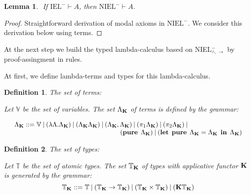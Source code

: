 \documentclass[a4paper]{article}
\newtheorem{lemma}{Lemma}
\newtheorem{defin}{Definition}
\begin{document}
\begin{lemma}
  $ $
  If $\text{IEL}^{-} \vdash A$, then $\text{NIEL}^{-} \vdash A$.
\end{lemma}

\begin{proof}
  Straightforward derivation of modal axioms in $\text{NIEL}^{-}$. We consider this derivation below using terms.
\end{proof}

  \vspace{\baselineskip}

  At the next step we build the typed lambda-calculus based on NIEL$^{-}_{\land, \to}$ by proof-assingment in
  rules.

  At first, we define lambda-terms and types for this lambda-calculus.

  \vspace{\baselineskip}

  \begin{defin} The set of terms:

  Let $\mathbb{V}$ be the set of variables. The set $\Lambda_{{\bf K}}$ of terms is defined by the grammar:

$\begin{array}{lll}
& \Lambda_{{\bf K}} ::= \mathbb{V} \: | \:  (\lambda \Lambda.\Lambda_{{\bf K}}) \: | \: (\Lambda_{{\bf K}}\Lambda_{{\bf K}}) \: | \: (\Lambda_{{\bf K}} , \Lambda_{{\bf K}}) \: | \: (\pi_1 \Lambda_{{\bf K}}) \: | \: (\pi_2 \Lambda_{{\bf K}}) \: | & \\
& \quad\quad\quad\quad\quad\quad\quad\quad\quad\quad\quad\quad\quad\quad\quad\quad ({\bf pure \: } \: \Lambda_{{\bf K}}) \: | \: ({\bf let \:\: pure} \:\: \Lambda_{{\bf K}} = \Lambda_{{\bf K}} \:\: {\bf in} \:\: \Lambda_{{\bf K}})
\end{array}$

  \end{defin}

  \begin{defin} The set of types:

  Let $\mathbb{T}$ be the set of atomic types. The set $\mathbb{T}_{{\bf K}}$ of types with applicative
  functor ${\bf K}$ is generated by the grammar:
  \begin{equation}
    \mathbb{T}_{{\bf K}} ::= \mathbb{T} \: | \: (\mathbb{T}_{{\bf K}} \to \mathbb{T}_{{\bf K}}) \: |
    \: (\mathbb{T}_{{\bf K}} \times \mathbb{T}_{{\bf K}}) \: | \: ({\bf K}\mathbb{T}_{{\bf K}})
  \end{equation}
  \end{defin}
\end{document}
